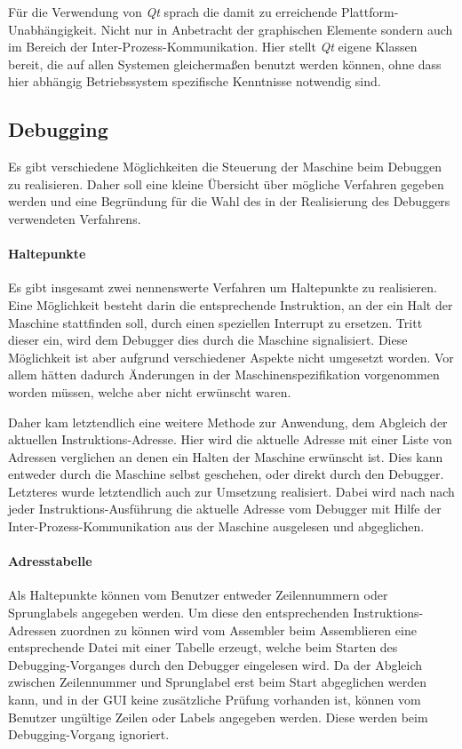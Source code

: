 Für die Verwendung von \emph{Qt} sprach die damit zu erreichende Plattform-Unabhängigkeit. Nicht nur in Anbetracht der graphischen Elemente sondern auch im Bereich der Inter-Prozess-Kommunikation. Hier stellt \emph{Qt} eigene Klassen bereit, die auf allen Systemen gleichermaßen benutzt werden können, ohne dass hier abhängig Betriebssystem spezifische Kenntnisse notwendig sind.

\subsection{Debugging}

Es gibt verschiedene Möglichkeiten die Steuerung der Maschine beim Debuggen zu realisieren. Daher soll eine kleine Übersicht über mögliche Verfahren gegeben werden und eine Begründung für die Wahl des in der Realisierung des Debuggers verwendeten Verfahrens. 

\paragraph{Haltepunkte}
Es gibt insgesamt zwei nennenswerte Verfahren um Haltepunkte zu realisieren. Eine Möglichkeit besteht darin die entsprechende Instruktion, an der ein Halt der Maschine stattfinden soll, durch einen speziellen Interrupt zu ersetzen. Tritt dieser ein, wird dem Debugger dies durch die Maschine signalisiert. Diese Möglichkeit ist aber aufgrund verschiedener Aspekte nicht umgesetzt worden. Vor allem hätten dadurch Änderungen in der Maschinenspezifikation vorgenommen worden müssen, welche aber nicht erwünscht waren.

Daher kam letztendlich eine weitere Methode zur Anwendung, dem Abgleich der aktuellen Instruktions-Adresse. Hier wird die aktuelle Adresse mit einer Liste von Adressen verglichen an denen ein Halten der Maschine erwünscht ist. Dies kann entweder durch die Maschine selbst geschehen, oder direkt durch den Debugger. Letzteres wurde letztendlich auch zur Umsetzung realisiert. Dabei wird nach nach jeder Instruktions-Ausführung die aktuelle Adresse vom Debugger mit Hilfe der Inter-Prozess-Kommunikation aus der Maschine ausgelesen und abgeglichen.

\paragraph{Adresstabelle}
Als Haltepunkte können vom Benutzer entweder Zeilennummern oder Sprunglabels angegeben werden. Um diese den entsprechenden Instruktions-Adressen zuordnen zu können wird vom Assembler beim Assemblieren eine entsprechende Datei mit einer Tabelle erzeugt, welche beim Starten des Debugging-Vorganges durch den Debugger eingelesen wird. Da der Abgleich zwischen Zeilennummer und Sprunglabel erst beim Start abgeglichen werden kann, und in der GUI keine zusätzliche Prüfung vorhanden ist, können vom Benutzer ungültige Zeilen oder Labels angegeben werden. Diese werden beim Debugging-Vorgang ignoriert.

